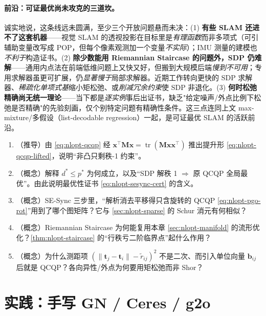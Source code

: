 \paragraph{前沿：可证最优尚未攻克的三道坎。}\cite{carlone2026handbook}
诚实地说，这条线远未圆满，至少三个开放问题悬而未决：(1) \textbf{有些 SLAM 还进不了这套机器}——视觉 SLAM 的透视投影在目标里是\emph{有理函数}而非多项式（可引辅助变量改写成 POP，但每个像素观测加一个变量\emph{不实际}）；IMU 测量的建模也\emph{不利于}构造证书。(2) \textbf{除少数能用 Riemannian Staircase 的问题外，SDP 仍难解}——通用内点法在前端低维问题上又快又好，但搬到大规模后端\emph{慢到不可用}；专用求解器虽更可扩展，仍\emph{显著慢于}局部求解器。近期工作转向更快的 SDP 求解器、\emph{稀疏化单项式基}缩小矩松弛、或\emph{削减冗余约束}使 SDP 非退化。(3) \textbf{何时松弛精确尚无统一理论}——当下都是\emph{逐实例}事后出证书，缺乏"给定噪声/外点比例下松弛是否精确"的先验刻画，仅个别特定问题有精确性条件。这三点连同上文 max-mixture/多假设（list-decodable regression）一起，是可证最优 SLAM 的活跃前沿。

\begin{practice}
\begin{enumerate}
  \item （推导）由 \cref{eq:nlopt-qcqp} 经 $\mathbf{x}^\top\mathbf{M}\mathbf{x}=\operatorname{tr}(\mathbf{M}\mathbf{x}\mathbf{x}^\top)$ 推出提升形 \cref{eq:nlopt-qcqp-lifted}，说明“非凸只剩秩-1 约束”。
  \item （概念）解释 $d^*\le p^*$ 为何成立，以及“SDP 解秩 1 $\Rightarrow$ 原 QCQP 全局最优”。由此说明最优性证书 \cref{eq:nlopt-sesync-cert} 的含义。
  \item （概念）SE-Sync 三步里，“解析消去平移得只含旋转的 QCQP \cref{eq:nlopt-pgo-rot}”用到了哪个图矩阵？它与 \cref{sec:nlopt-sparse} 的 Schur 消元有何相似？
  \item （概念）Riemannian Staircase 为何能复用本章 \cref{sec:nlopt-manifold} 的流形优化？\cref{thm:nlopt-staircase} 的“行秩亏二阶临界点”起什么作用？
  \item （概念）为什么测距项 $(\|\mathbf{t}_j-\mathbf{t}_i\|-\tilde r_{ij})^2$ 不是二次、而引入单位向量 $\mathbf{b}_{ij}$ 后就是 QCQP？各向异性/外点为何要用矩松弛而非 Shor？
\end{enumerate}
\end{practice}

\section{实践：手写 GN / Ceres / g2o}
\label{sec:nlopt-practice}

